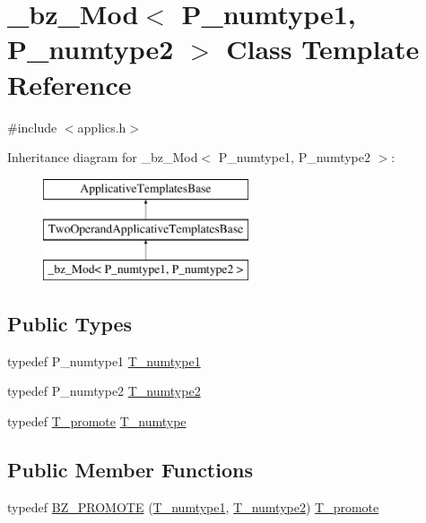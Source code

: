 \hypertarget{class__bz__Mod}{}\section{\+\_\+bz\+\_\+\+Mod$<$ P\+\_\+numtype1, P\+\_\+numtype2 $>$ Class Template Reference}
\label{class__bz__Mod}


{\ttfamily \#include $<$applics.\+h$>$}

Inheritance diagram for \+\_\+bz\+\_\+\+Mod$<$ P\+\_\+numtype1, P\+\_\+numtype2 $>$\+:\begin{figure}[H]
\begin{center}
\leavevmode
\includegraphics[height=3.000000cm]{class__bz__Mod}
\end{center}
\end{figure}
\subsection*{Public Types}
\begin{DoxyCompactItemize}
\item 
typedef P\+\_\+numtype1 \hyperlink{class__bz__Mod_aaa07caed5d008d47b88d01898ab24fb4}{T\+\_\+numtype1}
\item 
typedef P\+\_\+numtype2 \hyperlink{class__bz__Mod_a2861cf676a84bd9be4b3da33300b38ed}{T\+\_\+numtype2}
\item 
typedef \hyperlink{minmax_8h_aaa88a440c2f0d00798d5b1d42c79308d}{T\+\_\+promote} \hyperlink{class__bz__Mod_a70ec6103ff43448ed49515b9e4444657}{T\+\_\+numtype}
\end{DoxyCompactItemize}
\subsection*{Public Member Functions}
\begin{DoxyCompactItemize}
\item 
typedef \hyperlink{class__bz__Mod_a072f6b080ca296f05e447c3320837b60}{B\+Z\+\_\+\+P\+R\+O\+M\+O\+T\+E} (\hyperlink{class__bz__Mod_aaa07caed5d008d47b88d01898ab24fb4}{T\+\_\+numtype1}, \hyperlink{class__bz__Mod_a2861cf676a84bd9be4b3da33300b38ed}{T\+\_\+numtype2}) \hyperlink{minmax_8h_aaa88a440c2f0d00798d5b1d42c79308d}{T\+\_\+promote}
\end{DoxyCompactItemize}
